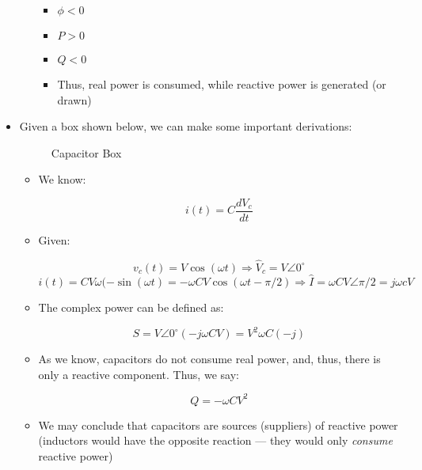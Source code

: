 \begin{itemize}
\begin{itemize}
        \begin{itemize}

          \item $\phi<0$

          \item $P>0$

          \item $Q<0$

          \item Thus, real power is consumed, while reactive power is generated (or drawn)

        \end{itemize}

    \end{itemize}

  \item Given a box shown below, we can make some important derivations:

    \begin{figure}[H]
      \centering
      
      \caption{Capacitor Box}
      \label{fig:3}
    \end{figure}

    \begin{itemize}

      \item We know:

        $$i(t)=C\frac{dV_c}{dt}$$

      \item Given:

        $$v_c(t)=V\cos(\omega t)\Rightarrow \hat{V}_c=V\angle0^{\circ}$$
        $$i(t)=CV\omega(-\sin(\omega t)=-\omega CV\cos(\omega t-\pi/2)\Rightarrow \hat{I}=\omega CV\angle\pi/2=j\omega cV$$

        \item The complex power can be defined as:

          $$S=V\angle0^{\circ}(-j\omega CV)=V^2\omega C(-j)$$

        \item As we know, capacitors do not consume real power, and, thus, there is only a reactive component. Thus, we say:

          $$Q=-\omega CV^2$$

        \item We may conclude that capacitors are sources (suppliers) of reactive power (inductors would have the opposite reaction — they would only \textit{consume} reactive power)

    \end{itemize}


\end{itemize}
